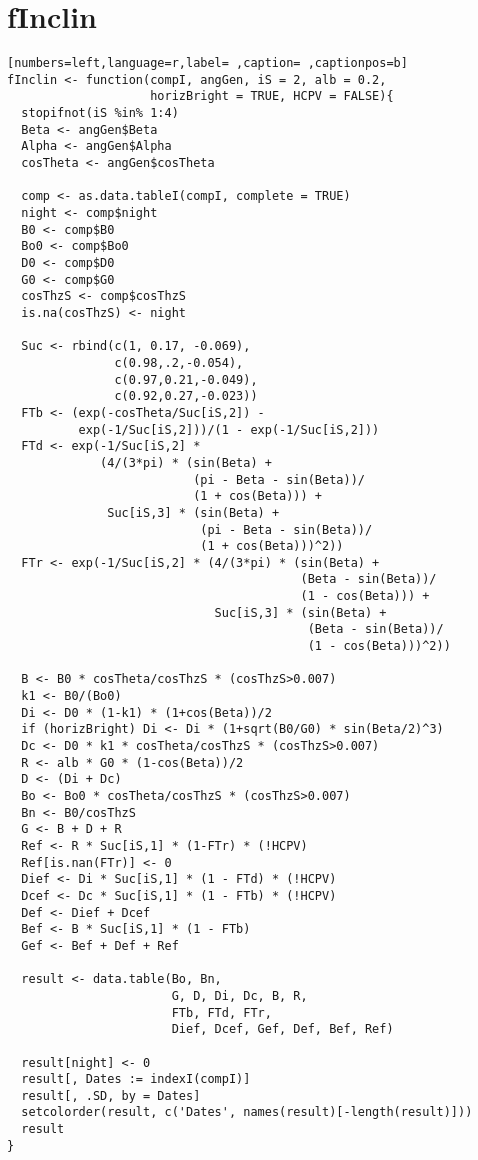 \section{fInclin}
\label{sec:org3f30883}
\begin{lstlisting}[numbers=left,language=r,label= ,caption= ,captionpos=b]
fInclin <- function(compI, angGen, iS = 2, alb = 0.2,
                    horizBright = TRUE, HCPV = FALSE){
  stopifnot(iS %in% 1:4)
  Beta <- angGen$Beta
  Alpha <- angGen$Alpha
  cosTheta <- angGen$cosTheta
  
  comp <- as.data.tableI(compI, complete = TRUE)
  night <- comp$night
  B0 <- comp$B0
  Bo0 <- comp$Bo0
  D0 <- comp$D0
  G0 <- comp$G0
  cosThzS <- comp$cosThzS
  is.na(cosThzS) <- night
  
  Suc <- rbind(c(1, 0.17, -0.069),
               c(0.98,.2,-0.054),
               c(0.97,0.21,-0.049),
               c(0.92,0.27,-0.023))
  FTb <- (exp(-cosTheta/Suc[iS,2]) -
          exp(-1/Suc[iS,2]))/(1 - exp(-1/Suc[iS,2]))
  FTd <- exp(-1/Suc[iS,2] *
             (4/(3*pi) * (sin(Beta) +
                          (pi - Beta - sin(Beta))/
                          (1 + cos(Beta))) +
              Suc[iS,3] * (sin(Beta) +
                           (pi - Beta - sin(Beta))/
                           (1 + cos(Beta)))^2))
  FTr <- exp(-1/Suc[iS,2] * (4/(3*pi) * (sin(Beta) +
                                         (Beta - sin(Beta))/
                                         (1 - cos(Beta))) +
                             Suc[iS,3] * (sin(Beta) +
                                          (Beta - sin(Beta))/
                                          (1 - cos(Beta)))^2))
  
  B <- B0 * cosTheta/cosThzS * (cosThzS>0.007) 
  k1 <- B0/(Bo0)
  Di <- D0 * (1-k1) * (1+cos(Beta))/2
  if (horizBright) Di <- Di * (1+sqrt(B0/G0) * sin(Beta/2)^3)
  Dc <- D0 * k1 * cosTheta/cosThzS * (cosThzS>0.007)
  R <- alb * G0 * (1-cos(Beta))/2
  D <- (Di + Dc)
  Bo <- Bo0 * cosTheta/cosThzS * (cosThzS>0.007) 
  Bn <- B0/cosThzS
  G <- B + D + R
  Ref <- R * Suc[iS,1] * (1-FTr) * (!HCPV)
  Ref[is.nan(FTr)] <- 0 
  Dief <- Di * Suc[iS,1] * (1 - FTd) * (!HCPV)
  Dcef <- Dc * Suc[iS,1] * (1 - FTb) * (!HCPV)
  Def <- Dief + Dcef
  Bef <- B * Suc[iS,1] * (1 - FTb)
  Gef <- Bef + Def + Ref

  result <- data.table(Bo, Bn,
                       G, D, Di, Dc, B, R,
                       FTb, FTd, FTr,
                       Dief, Dcef, Gef, Def, Bef, Ref) 

  result[night] <- 0
  result[, Dates := indexI(compI)]
  result[, .SD, by = Dates]
  setcolorder(result, c('Dates', names(result)[-length(result)]))
  result
}
\end{lstlisting}
